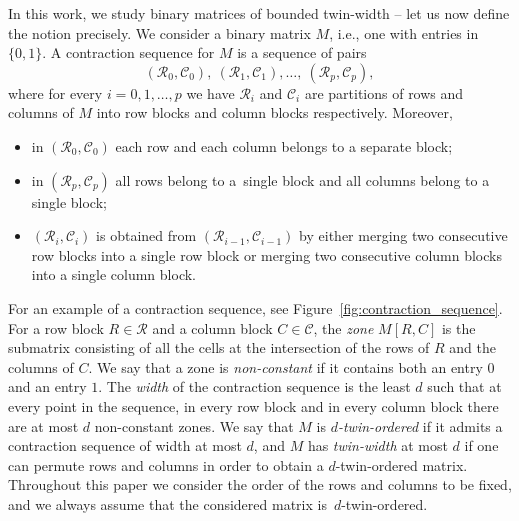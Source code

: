 \documentclass[runningheads]{llncs}
\begin{document}
In this work, we study binary matrices of bounded twin-width -- let us now define the notion precisely. We consider a binary matrix $M$, i.e., one with entries in $\{0,1\}$. A contraction sequence for $M$ is a sequence of pairs 
$$(\mathcal{R}_0, \mathcal{C}_0),\ (\mathcal{R}_1, \mathcal{C}_1), \dots ,\ (\mathcal{R}_p, \mathcal{C}_p),$$
where for every $i=0,1,\dots, p$ we have $\mathcal{R}_i$ and $\mathcal{C}_i$ are partitions of rows and columns of $M$ into row blocks and column blocks respectively. Moreover,
\begin{itemize}
	\item in $(\mathcal{R}_0, \mathcal{C}_0)$ each row and each column belongs to a separate block;
	\item in $(\mathcal{R}_p, \mathcal{C}_p)$ all rows belong to a~single block and all columns belong to a single block;
	\item $(\mathcal{R}_i, \mathcal{C}_i)$ is obtained from  $(\mathcal{R}_{i-1}, \mathcal{C}_{i-1})$ by either merging two consecutive row blocks into a single row block or merging two consecutive column blocks into a single column block.
\end{itemize}
For an example of a contraction sequence, see Figure~\ref{fig:contraction_sequence}.
 For a row block $R\in \mathcal{R}$ and a column block $C\in \mathcal{C}$, the {\em{zone}} $M[R,C]$ is the submatrix consisting of all the cells at the intersection of the rows of $R$ and the columns of $C$. We say that a zone is {\em{non-constant}} if it contains both an entry $0$ and an entry $1$. The {\em{width}} of the contraction sequence is the least $d$ such that at every point in the sequence, in every row block and in every column block there are at most $d$ non-constant zones. We say that $M$ is {\em{$d$-twin-ordered}} if it admits a contraction sequence of width at most $d$, and $M$ has {\em{twin-width}} at most $d$ if one can permute rows and columns in order to obtain a $d$-twin-ordered matrix. Throughout this paper we consider the order of the rows and columns to be fixed, and we always assume that the considered matrix is~$d$-twin-ordered. 
\end{document}
